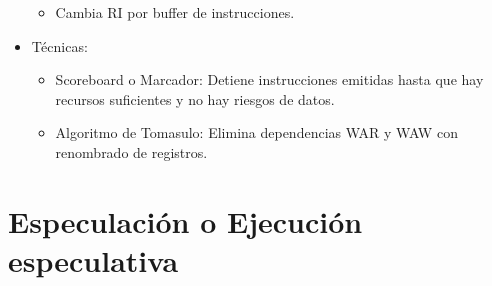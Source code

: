 \documentclass[12pt, twoside, openright]{report} %
\begin{document}
\begin{itemize}
    \begin{itemize}
    
    \item
      Cambia RI por buffer de instrucciones.
    \end{itemize}
  \item
    Técnicas:
  

    \begin{itemize}
      \item
      Scoreboard o Marcador: Detiene instrucciones emitidas hasta que hay
      recursos suficientes y no hay riesgos de datos.
    \item
      Algoritmo de Tomasulo: Elimina dependencias WAR y WAW con
      renombrado de registros.
    \end{itemize}
  \end{itemize}

  \section{Especulación o Ejecución especulativa}
\end{document}
